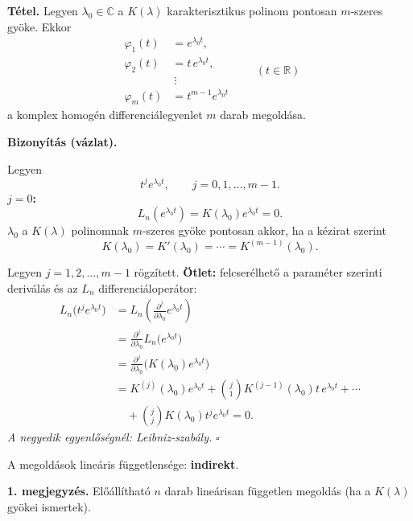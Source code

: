 \begin{matbox}
\textbf{Tétel.} Legyen $\lambda_0\in\mathbb C$ a
$K(\lambda)$ karakterisztikus polinom pontosan $m$-szeres gyöke.
Ekkor
\[
 \begin{aligned}
 \varphi_1(t)&=e^{\lambda_0t},\\
 \varphi_2(t)&=t\,e^{\lambda_0t},\\
 &\ \vdots\\
 \varphi_m(t)&=t^{m-1}e^{\lambda_0t}
 \end{aligned}
 \qquad(t\in\mathbb R)
\]
a komplex homogén differenciálegyenlet $m$ darab megoldása.
\end{matbox}

\textbf{Bizonyítás (vázlat).}

Legyen
\[
 t^j e^{\lambda_0t},\qquad j=0,1,\ldots,m-1.
\]
\textbf{$j=0$:}
\[
 L_n(e^{\lambda_0t})=K(\lambda_0)e^{\lambda_0t}=0.
\]
$\lambda_0$ a $K(\lambda)$ polinomnak $m$-szeres gyöke pontosan akkor,
ha a kézirat szerint
\[
 K(\lambda_0)=K'(\lambda_0)=\cdots=K^{(m-1)}(\lambda_0).
\]

Legyen $j=1,2,\ldots,m-1$ rögzített.
\textbf{Ötlet:} felcserélhető a paraméter szerinti deriválás
és az $L_n$ differenciáloperátor:
\begin{align*}
 L_n\bigl(t^j e^{\lambda_0t}\bigr)
 &=L_n\!\left(\frac{\partial^j}{\partial\lambda_0}
                e^{\lambda_0t}\right)\\
 &=\frac{\partial^j}{\partial\lambda_0}
         L_n\bigl(e^{\lambda_0t}\bigr)\\
 &=\frac{\partial^j}{\partial\lambda_0}
         \bigl(K(\lambda_0)e^{\lambda_0t}\bigr)\\
 &=K^{(j)}(\lambda_0)e^{\lambda_0t}
   +\binom{j}{1}K^{(j-1)}(\lambda_0)t\,e^{\lambda_0t}
   +\cdots\\
 &\quad+\binom{j}{j}K(\lambda_0)t^j e^{\lambda_0t}
   =0.
\end{align*}
\textit{A negyedik egyenlőségnél: Leibniz-szabály.}
\hfill$\square$

A megoldások lineáris függetlensége: \textbf{indirekt}.

\textbf{1. megjegyzés.} Előállítható $n$ darab lineárisan független
megoldás (ha a $K(\lambda)$ gyökei ismertek).

